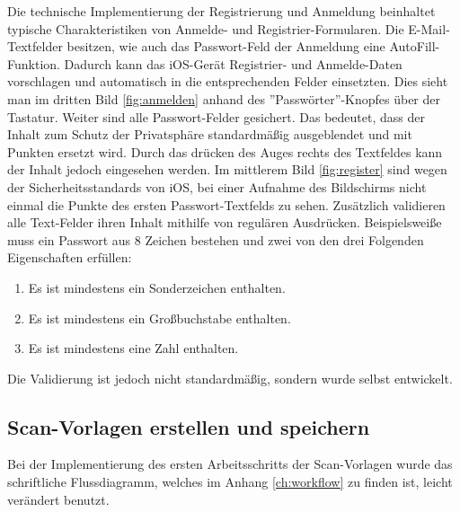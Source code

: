\documentclass[nomenclature, oneside, 150]{HSMW-Thesis}
\begin{document}
			Die technische Implementierung der Registrierung und Anmeldung beinhaltet typische Charakteristiken von Anmelde- und Registrier-Formularen. Die E-Mail-Textfelder besitzen, wie auch das Passwort-Feld der Anmeldung eine AutoFill-Funktion. Dadurch kann das iOS-Gerät Registrier- und Anmelde-Daten vorschlagen und automatisch in die entsprechenden Felder einsetzten. Dies sieht man im dritten Bild \ref{fig:anmelden} anhand des ''Passwörter''-Knopfes über der Tastatur.  Weiter sind alle Passwort-Felder gesichert. Das bedeutet, dass der Inhalt zum Schutz der Privatsphäre standardmäßig ausgeblendet und mit Punkten ersetzt wird. Durch das drücken des Auges rechts des Textfeldes kann der Inhalt jedoch eingesehen werden. Im mittlerem Bild \ref{fig:register} sind wegen der Sicherheitsstandards von iOS, bei einer Aufnahme des Bildschirms nicht einmal die Punkte des ersten Passwort-Textfelds zu sehen. Zusätzlich validieren alle Text-Felder ihren Inhalt mithilfe von regulären Ausdrücken. Beispielsweiße muss ein Passwort aus 8 Zeichen bestehen und zwei von den drei Folgenden Eigenschaften erfüllen:
			\begin{enumerate}
				\item Es ist mindestens ein Sonderzeichen enthalten.
				\item Es ist mindestens ein Großbuchstabe enthalten.
				\item Es ist mindestens eine Zahl enthalten.
			\end{enumerate}
			Die Validierung ist jedoch nicht standardmäßig, sondern wurde selbst entwickelt.
			
		\subsection{Scan-Vorlagen erstellen und speichern}
			Bei der Implementierung des ersten Arbeitsschritts der Scan-Vorlagen wurde das schriftliche Flussdiagramm, welches im Anhang \ref{ch:workflow} zu finden ist, leicht verändert benutzt.
			
\end{document}
